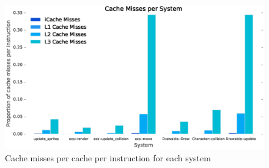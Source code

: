 \documentclass[10pt]{scrartcl}
\begin{document}
\begin{figure}[H]
	\centering
	\includegraphics[width=\textwidth]{profiling/individual.eps}
	\caption{Cache misses per cache per instruction for each system}
	\label{fig:function_misses}
\end{figure}
\end{document}
